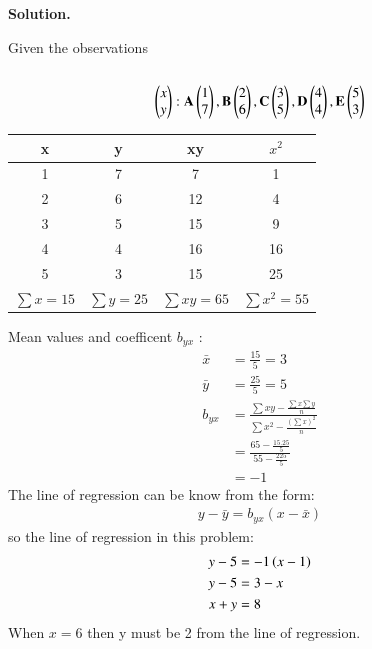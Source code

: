 \documentclass[journal,12pt,twocolumn]{IEEEtran}
\begin{document}
\textbf{Solution.}

Given the observations \\\\
\begin{align}
\begin{pmatrix}x \\y \end{pmatrix}:
\mathbf{A}\begin{pmatrix}1 \\7 \end{pmatrix},
\mathbf {B}\begin{pmatrix}2 \\6 \end{pmatrix},
\mathbf {C}\begin{pmatrix}3 \\5 \end{pmatrix},
 \mathbf {D}\begin{pmatrix}4 \\4 \end{pmatrix},
\mathbf {E}\begin{pmatrix}5 \\3 \end{pmatrix}
\end{align}
\begin{table}[H]
	\resizebox{\columnwidth}{!} {
		\begin{tabular}{|c|c|c|c|}
			\hline
			x & y & xy & $x^{2}$ \\
			\hline
			1 &  7 & 7  &1 \\
		
				2 &  6 & 12   &4 \\
			
				3 &  5 & 15  &9 \\
			
				4 &  4 & 16  &16 \\
			
				5 &  3 & 15  &25 \\
			\hline
			$\sum x=15$ &$\sum  y=25$ &$\sum xy=65$  &$\sum x^2=55$  \\
			\hline
		\end{tabular}
	}
\end{table}
Mean values and coefficent $b_{yx}$ :
\begin{align}
	\bar{x}&=\frac{15}{5}=3\\
	\bar{y}&=\frac{25}{5}=5\\
	b_{yx} &=\frac{\sum xy - \frac{\sum x \sum y}{n}}{\sum x^{2}- \frac {(\sum x)^{2}}{n} }\\
	&=\frac{65 -\frac{15.25}{5}}{55-\frac{225}{5}}\\
	&= -1 
\end{align}
The line of regression can be know from the form:
\begin{align}
	y-\bar{y}=b_{yx}(x-\bar{x})
\end{align}
so the line of regression in this problem:
\begin{align}
	y-5&=-1\left(x-1\right) \\
	y-5&=3-x\\
	x+y&=8
\end{align}
When $x=6$ then y must be 2 from the line of regression.
\end{document}

